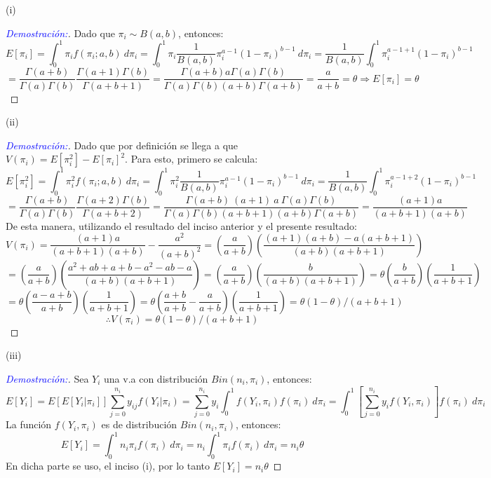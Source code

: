 \documentclass[12pt,a4paper,oneside]{article}
\begin{document}
\begin{compactenum}
	\item[(i)] \begin{proof}[\textcolor{blue}{Demostración:}] Dado que $\pi_i \sim B(a,b)$, entonces:
	$$E[ \pi_i ] = \int_0^1 \pi_i f(\pi_i; a, b) \ d\pi_i = \int_0^1 \pi_i \dfrac{1}{B(a, b)} \pi_i^{a - 1}(1 - \pi_i)^{b - 1} \ d\pi_i = \frac{1}{B(a, b)} \int_0^1 \pi_i^{a - 1 + 1}(1 - \pi_i)^{b - 1}$$ 
	$$= \frac{\Gamma(a + b)}{\Gamma(a) \Gamma(b)} \frac{\Gamma(a + 1) \Gamma(b)}{\Gamma(a + b + 1)} = \frac{\Gamma(a + b) a \Gamma(a) \Gamma(b)}{\Gamma(a) \Gamma(b) (a + b) \Gamma(a + b)} = \frac{a}{a + b} = \theta \Rightarrow E[ \pi_i ] = \theta$$
	
	\end{proof}
	\item[(ii)] \begin{proof}[\textcolor{blue}{Demostración:}] Dado que por definición se llega a que $V(\pi_i) = E[\pi_i^2] - E[\pi_i]^2$. Para esto, primero se calcula:
	$$E[ \pi_i^2 ] = \int_0^1 \pi_i^2 f(\pi_i; a, b) \ d\pi_i = \int_0^1 \pi_i^2 \dfrac{1}{B(a, b)} \pi_i^{a - 1}(1 - \pi_i)^{b - 1} \ d\pi_i = \frac{1}{B(a, b)} \int_0^1 \pi_i^{a - 1 + 2}(1 - \pi_i)^{b - 1}$$
	$$= \frac{\Gamma(a + b)}{\Gamma(a) \Gamma(b)} \frac{\Gamma(a + 2) \Gamma(b)}{\Gamma(a + b + 2)} = \frac{\Gamma(a + b) \ (a + 1) \ a \ \Gamma(a) \Gamma(b)}{\Gamma(a) \Gamma(b) (a + b + 1) (a + b) \Gamma(a + b)} = \frac{(a + 1)a}{(a + b + 1)(a + b)}$$
	De esta manera, utilizando el resultado del inciso anterior y el presente resultado:
	$$V(\pi_i) = \frac{(a + 1) a}{(a + b + 1)(a + b)} - \frac{a^2}{(a + b)^2} = \left( \frac{a}{a + b} \right) \left( \frac{(a + 1)(a + b) - a (a + b + 1)}{(a + b)(a + b + 1)} \right)$$
	$$ = \left( \frac{a}{a + b} \right) \left( \frac{a^2 + ab + a + b - a^2 - ab - a}{(a + b)(a + b + 1)} \right) = \left( \frac{a}{a + b} \right) \left( \frac{b}{(a + b)(a + b + 1)} \right) = \theta \left( \frac{b}{a + b} \right) \left( \frac{1}{a + b + 1} \right)$$
	$$= \theta \left( \frac{a - a + b}{a + b} \right) \left( \frac{1}{a + b + 1} \right) = \theta \left(\frac{a + b}{a + b} - \frac{a}{a + b} \right) \left( \frac{1}{a + b + 1} \right) = \theta (1 - \theta) / (a + b + 1)$$
	$$ \therefore V(\pi_i) = \theta (1 - \theta) / (a + b + 1)$$
	\end{proof}

	\item[(iii)] \begin{proof}[\textcolor{blue}{Demostración:}] Sea $Y_i$ una v.a con distribución $Bin(n_i, \pi_i)$, entonces:
	$$E[Y_i] = E[E[Y_i | \pi_i]] \sum_{j = 0}^{n_i} y_{ij} f(Y_i| \pi_i) = \sum_{j = 0}^{n_i} y_i \int_0^1 f(Y_i, \pi_i) f(\pi_i) \ d\pi_i = \int_0^1 \left[ \sum_{j = 0}^{n_i} y_i f(Y_i, \pi_i) \right] f(\pi_i) \ d\pi_i$$
	La función $f(Y_i,\pi_i)$ es de distribución $Bin(n_i, \pi_i)$, entonces:
	$$E[Y_i] = \int_0^1 n_i \pi_i f(\pi_i) \ d\pi_i = n_i \int_0^1 \pi_i f(\pi_i) \ d\pi_i = n_i \theta$$
	En dicha parte se uso, el inciso (i), por lo tanto $E[Y_i] = n_i \theta$ 
	

\end{proof}
\end{compactenum}
\end{document}
